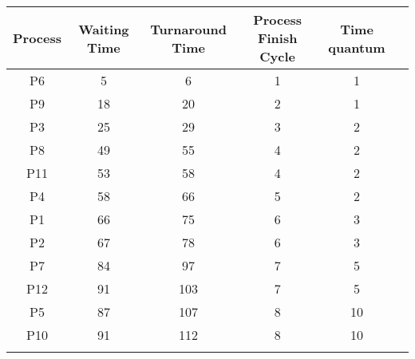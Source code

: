 \documentclass{article}
\begin{document}
\bigskip

\begin{center}
    \begin{tabular}{|c|c|c|c|c|c|}
    \hline
    \rowcolor{darkblue}
    {\textbf{Process}} &{\textbf{Waiting Time}} & {\textbf{Turnaround Time}} & {\textbf{Process Finish Cycle}} & {\textbf{Time quantum}} \\
    \hline \rowcolor{lightblue}
    P6 & 5 & 6 & 1 & 1\\
    \hline 
    P9 & 18 & 20 & 2 & 1\\
    \hline \rowcolor{lightblue}
    P3 & 25 & 29 & 3 & 2\\
    \hline 
    P8 & 49 & 55 & 4 & 2 \\
    \hline \rowcolor{lightblue}
    P11 & 53 & 58 & 4 & 2 \\
    \hline 
    P4 & 58 & 66 & 5 & 2 \\
    \hline \rowcolor{lightblue}
    P1 & 66 & 75 & 6 & 3 \\
    \hline 
    P2 & 67 & 78 & 6 & 3 \\
    \hline \rowcolor{lightblue}
    P7 & 84 & 97 & 7 & 5 \\
    \hline 
    P12 & 91 & 103 & 7 & 5 \\
    \hline \rowcolor{lightblue}
    P5 & 87 & 107 & 8 & 10 \\
    \hline 
    P10 & 91 & 112 & 8 & 10 \\
    \hline \rowcolor{lightblue}
    \end{tabular}
\end{center}
\end{document}
